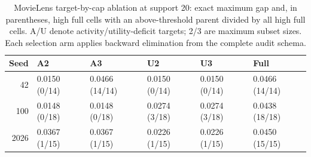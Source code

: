 \begin{table}[t]
\centering
\caption{MovieLens target-by-cap ablation at support 20: exact maximum gap and, in parentheses, high full cells with an above-threshold parent divided by all high full cells. A/U denote activity/utility-deficit targets; 2/3 are maximum subset sizes. Each selection arm applies backward elimination from the complete audit schema.}
\label{tab:target-ablation}
\small
\begin{tabular}{rlllll}
\toprule
Seed & A2 & A3 & U2 & U3 & Full \\
\midrule
42 & 0.0150 (0/14) & 0.0466 (14/14) & 0.0150 (0/14) & 0.0150 (0/14) & 0.0466 (14/14) \\
100 & 0.0148 (0/18) & 0.0148 (0/18) & 0.0274 (3/18) & 0.0274 (3/18) & 0.0438 (18/18) \\
2026 & 0.0367 (1/15) & 0.0367 (1/15) & 0.0226 (1/15) & 0.0226 (1/15) & 0.0450 (15/15) \\
\bottomrule
\end{tabular}
\end{table}
